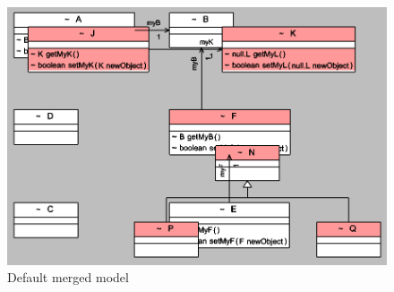 \begin{figure}
	\centering
    \includegraphics[width=1\linewidth]{default_sample.PNG}
    \caption{Default merged model}
    \label{fig : default sample}
\end{figure}

